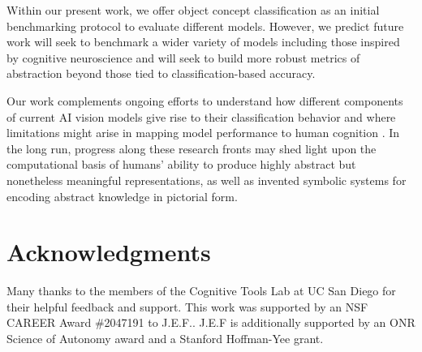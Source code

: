 \documentclass[10pt,letterpaper]{article}
\begin{document}
Within our present work, we offer object concept classification as an initial benchmarking protocol to evaluate different models.
However, we predict future work will seek to benchmark a wider variety of models including those inspired by cognitive neuroscience \cite{chen2022unsupervised, zhuang2021unsupervised,kubilius2019brain} and will seek to build more robust metrics of abstraction beyond those tied to classification-based accuracy.

Our work complements ongoing efforts to understand how different components of current AI vision models give rise to their classification behavior \cite{hermann2020shapes, nguyen2020wide,schott2021visual,chen2021intriguing} and where limitations might arise in mapping model performance to human cognition \cite{ zhou2019humans,bowers2022deep, mahowald2023dissociating}. 
In the long run, progress along these research fronts may shed light upon the computational basis of humans' ability to produce highly abstract but nonetheless meaningful representations, as well as invented symbolic systems for encoding abstract knowledge in pictorial form.


\vspace{-.5em}
\section{Acknowledgments}

Many thanks to the members of the Cognitive Tools Lab at UC San Diego for their helpful feedback and support. 
This work was supported by an NSF CAREER Award \#2047191 to J.E.F..
J.E.F is additionally supported by an ONR Science of Autonomy award and a Stanford Hoffman-Yee grant.


\vspace{1em}




\setlength{\bibleftmargin}{.125in}
\setlength{\bibindent}{-\bibleftmargin}

\end{document}
